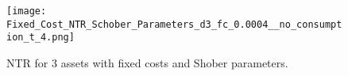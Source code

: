 \documentclass[11pt]{article}
\begin{document}
\begin{figure}[!ht]
    \centering
    \texttt{[image: Fixed\_Cost\_NTR\_Schober\_Parameters\_d3\_fc\_0.0004\_\_no\_consumption\_t\_4.png]}
    \caption{NTR for 3 assets with fixed costs and Shober parameters.}
    \label{fig: NTR_Fixed_3d_Shober}
\end{figure}

\ifdefined\COMPILINGMAIN
\else
\end{document}
